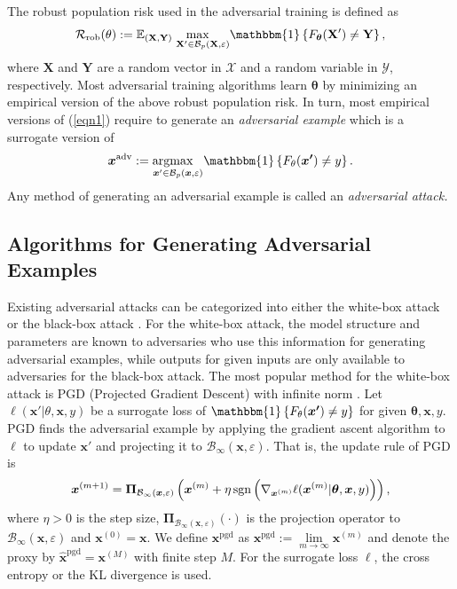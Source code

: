 \documentclass[nohyperref]{article}
\theoremstyle{plain}
\theoremstyle{definition}
\theoremstyle{remark}
\begin{document}
The robust population risk used in the adversarial training is defined as
\begin{equation}
\label{eqn1}
\mathcal{R}_{\text{rob}}(\theta):=\mathbb{E}_{\mathbf{(X,Y)}} \;  \underset{\mathbf{X'} \in \mathcal{B}_p(\mathbf{X}, \varepsilon) }{\max\;\;\;} \mathbbm{1}\left\{F_{\bm{\theta}}(\mathbf{X'}) \neq \mathbf{Y} \right\},
\end{equation}
where $\mathbf{X}$ and $\mathbf{Y}$ are a random vector in $\mathcal{X}$  and a random variable in $\mathcal{Y}$, respectively. 
Most adversarial training algorithms learn $\bm{\theta}$
by minimizing an empirical version of the above robust population risk. 
In turn, most empirical versions of (\ref{eqn1})
require to generate an \textit{adversarial example}
which is a surrogate version of
$$\bm{x}^{\text{adv}}:= \underset{\bm{x}' \in \mathcal{B}_p(\bm{x}, \varepsilon) }{\operatorname{argmax}\;\;\;} \mathbbm{1}\left\{F_{\theta}(\bm{x'}) \neq y \right\}.$$
Any method of generating an adversarial example is called an \textit{adversarial attack.}

\subsection{Algorithms for Generating Adversarial Examples}
Existing adversarial attacks can be categorized into either the white-box attack \citep{goodfellow2015explaining, madry2018towards, carlini2017evaluating, croce2020minimally} or the black-box attack \citep{papernot2016transferability, papernot2017practical, chen2017zoo, ilyas2018blackbox, papernot2016science}. For the white-box attack, the model structure and parameters are known to adversaries who use this information for generating adversarial examples, while outputs for given inputs are only available to adversaries for the black-box attack.
The most popular method for the white-box attack is PGD (Projected Gradient Descent) with infinite norm \citep{madry2018towards}. Let $\ell(\bm{x}'|\theta,\bm{x},y)$ be a surrogate loss of $\mathbbm{1}\left\{F_{\theta}(\bm{x'}) \neq y \right\}$ for given $\bm{\theta},\bm{x},y$.
PGD finds the adversarial example 
by applying the gradient ascent algorithm to $\ell$  to update $\bm{x}'$ and projecting it to $\mathcal{B}_{\infty}(\bm{x}, \varepsilon).$ That is, the update rule of PGD is 
\begin{equation}
\footnotesize
\label{pgd}
    \bm{x}^{(m+1)}=\bm{\Pi}_{\mathcal{B}_{\infty}(\bm{x}, \varepsilon) }\left(\bm{x}^{(m)} + \eta \operatorname{sgn}\left(\nabla_{\bm{x}^{(m)}} \ell(\bm{x}^{(m)}|\bm{\theta},\bm{x},y)\right)\right),
\end{equation}
where $\eta>0$ is the step size, 
$\bm{\Pi}_{\mathcal{B}_{\infty}(\bm{x}, \varepsilon)}(\cdot)$ is the projection operator to $\mathcal{B}_{\infty}(\bm{x}, \varepsilon)$ and $\bm{x}^{(0)}=\bm{x}$. We define $\bm{x}^{\text{pgd}}$ as $\bm{x}^{\text{pgd}} := \lim \limits_{m \rightarrow \infty} \bm{x}^{(m)}$ and denote the proxy by $\widehat{\bm{x}}^{\text{pgd}}=\bm{x}^{(M)}$ with finite step $M$.
For the surrogate loss $\ell$, the cross entropy \citep{madry2018towards}
or the KL divergence \citep{zhang2019theoretically} is used.
\end{document}

